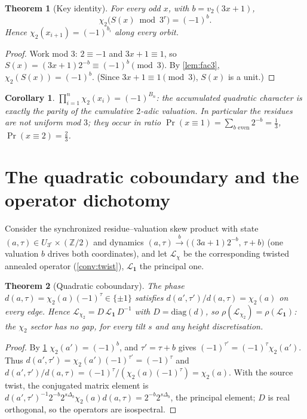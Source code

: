 \documentclass[11pt]{article}
\newcommand{\Z}{\mathbb{Z}}
\newcommand{\Lcal}{\mathcal{L}}
\newcommand{\UQ}{U_{3^r}}
\theoremstyle{plain}
\newtheorem{theorem}{Theorem}
\newtheorem{corollary}{Corollary}
\theoremstyle{definition}
\theoremstyle{remark}
\begin{document}
\begin{theorem}[Key identity]\label{thm:key}
For every odd $x$, with $b=v_2(3x+1)$,
\[
\chi_2\!\bigl(S(x)\bmod 3^r\bigr)=(-1)^{b}.
\]
Hence $\chi_2(x_{i+1})=(-1)^{b_i}$ along every orbit.
\end{theorem}
\begin{proof}
Work mod $3$: $2\equiv-1$ and $3x+1\equiv1$, so
$S(x)=(3x+1)2^{-b}\equiv(-1)^{b}\pmod3$. By \cref{lem:fac3},
$\chi_2(S(x))=(-1)^b$. (Since $3x+1\equiv1\pmod3$, $S(x)$ is a unit.)
\end{proof}

\begin{corollary}\label{cor:run}
$\prod_{i=1}^n\chi_2(x_i)=(-1)^{B_n}$: the accumulated quadratic character is
exactly the parity of the cumulative $2$-adic valuation. In particular the
residues are \emph{not} uniform mod $3$; they occur in ratio
$\Pr(x\equiv1)=\sum_{b\text{ even}}2^{-b}=\tfrac13$, $\Pr(x\equiv2)=\tfrac23$.
\end{corollary}

\section{The quadratic coboundary and the operator dichotomy}

Consider the synchronized residue--valuation skew product with state
$(a,\tau)\in\UQ\times(\Z/2)$ and dynamics
$(a,\tau)\xrightarrow{b}\bigl((3a+1)2^{-b},\,\tau+b\bigr)$ (one valuation $b$
drives both coordinates), and let $\Lcal_{\chi}$ be the corresponding twisted
annealed operator (\cref{conv:twist}), $\Lcal_{\mathbf1}$ the principal one.

\begin{theorem}[Quadratic coboundary]\label{thm:cobound}
The phase $d(a,\tau)=\chi_2(a)(-1)^{\tau}\in\{\pm1\}$ satisfies
$d(a',\tau')/d(a,\tau)=\chi_2(a)$ on every edge. Hence
$\Lcal_{\chi_2}=D\,\Lcal_{\mathbf1}\,D^{-1}$ with $D=\mathrm{diag}(d)$, so
$\rho(\Lcal_{\chi_2})=\rho(\Lcal_{\mathbf1})$: the $\chi_2$ sector has \emph{no
gap}, for every tilt $s$ and any height discretisation.
\end{theorem}
\begin{proof}
By \cref{thm:key} $\chi_2(a')=(-1)^b$, and $\tau'=\tau+b$ gives
$(-1)^{\tau'}=(-1)^\tau\chi_2(a')$. Thus
$d(a',\tau')=\chi_2(a')(-1)^{\tau'}=(-1)^\tau$ and
$d(a',\tau')/d(a,\tau)=(-1)^\tau/(\chi_2(a)(-1)^\tau)=\chi_2(a)$. With the source
twist, the conjugated matrix element is $d(a',\tau')^{-1}2^{-b}2^{s\Delta_b}
\chi_2(a)d(a,\tau)=2^{-b}2^{s\Delta_b}$, the principal element; $D$ is real
orthogonal, so the operators are isospectral.
\end{proof}
\end{document}
